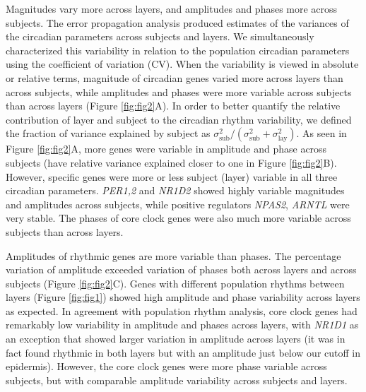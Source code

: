 Magnitudes vary more across layers, and amplitudes and phases more across subjects. The error propagation analysis produced estimates of the variances of the circadian parameters across subjects and layers. We simultaneously characterized this variability in relation to the population circadian parameters using the coefficient of variation (CV). When the variability is viewed in absolute or relative terms, magnitude of circadian genes varied more across layers than across subjects, while amplitudes and phases were more variable across subjects than across layers (Figure \ref{fig:fig2}A). In order to better quantify the relative contribution of layer and subject to the circadian rhythm variability, we defined the fraction of variance explained by subject as $\sigma^2_\textrm{sub}/(\sigma^2_\textrm{sub} + \sigma^2_\textrm{lay})$. As seen in Figure \ref{fig:fig2}A, more genes were variable in amplitude and phase across subjects (have relative variance explained closer to one in Figure \ref{fig:fig2}B). However, specific genes were more or less subject (layer) variable in all three circadian parameters. \textit{PER1,2} and \textit{NR1D2} showed highly variable magnitudes and amplitudes across subjects, while positive regulators \textit{NPAS2}, \textit{ARNTL} were very stable. The phases of core clock genes were also much more variable across subjects than across layers. 

Amplitudes of rhythmic genes are more variable than phases. The percentage variation of amplitude exceeded variation of phases both across layers and across subjects (Figure \ref{fig:fig2}C). Genes with different population rhythms between layers (Figure \ref{fig:fig1}) showed high amplitude and phase variability across layers as expected. In agreement with population rhythm analysis, core clock genes had remarkably low variability in amplitude and phases across layers, with \textit{NR1D1} as an exception that showed larger variation in amplitude across layers (it was in fact found rhythmic in both layers but with an amplitude just below our cutoff in epidermis). However, the core clock genes were more phase variable across subjects, but with comparable amplitude variability across subjects and layers. 

